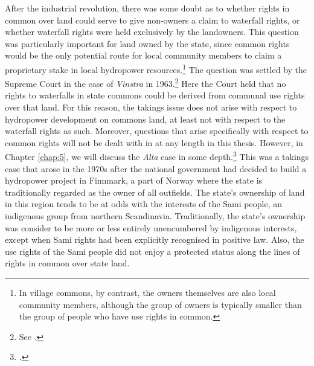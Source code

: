 After the industrial revolution, there was some doubt as to whether rights in common over land could serve to give non-owners a claim to waterfall rights, or whether waterfall rights were held exclusively by the landowners. This question was particularly important for land owned by the state, since common rights would be the only potential route for local community members to claim a proprietary stake in local hydropower resources.\footnote{In village commons, by contrast, the owners themselves are also local community members, although the group of owners is typically smaller than the group of people who have use rights in common.} The question was settled by the Supreme Court in the case of {\it Vinstra} in 1963.\footnote{See \cite{vinstra63}.} Here the Court held that no rights to waterfalls in state commons could be derived from communal use rights over that land. For this reason, the takings issue does not arise with respect to hydropower development on commons land, at least not with respect to the waterfall rights as such. Moreover, questions that arise specifically with respect to common rights will not be dealt with in at any length in this thesis.%
However, in Chapter \ref{chap:5}, we will discuss the {\it Alta} case in some depth.\footnote{\cite{alta82}.} This was a takings case that arose in the 1970s after the national government had decided to build a hydropower project in Finnmark, a part of Norway where the state is traditionally regarded as the owner of all outfields. The state's ownership of land in this region tends to be at odds with the interests of the Sami people, an indigenous group from northern Scandinavia. Traditionally, the state's ownership was consider to be more or less entirely unencumbered by indigenous interests, except when Sami rights had been explicitly recognised in positive law. Also, the use rights of the Sami people did not enjoy a protected status along the lines of rights in common over state land.%

